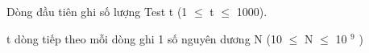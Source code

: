 Dòng đầu tiên ghi số lượng Test t (1  $\le$  t  $\le$  1000).  

   t dòng tiếp theo mỗi dòng ghi 1 số nguyên dương N (10  $\le$  N  $\le$  10   $^    9   $   )  

\